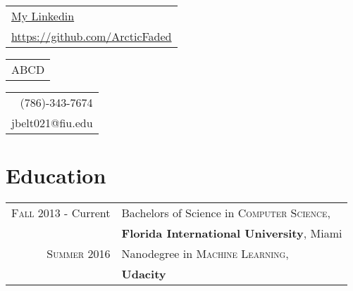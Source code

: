 \documentclass[a4paper,10pt]{article}
\begin{document}

\pagestyle{empty} %


\sffamily%
{\small\begin{tabular}[c]{l}
  \href{https://www.linkedin.com/in/jonathanbeltranus}{My Linkedin}\\
  \href{https://github.com/ArcticFaded}{https://github.com/ArcticFaded}
\end{tabular}}\hfill%
{\Large\bfseries\begin{tabular}[c]{c}
  ABCD
\end{tabular}}\hfill%
{\small\begin{tabular}[c]{r}
  (786)-343-7674 \\
  jbelt021@fiu.edu
\end{tabular}}%

\bigskip



\section{Education}
\begin{tabular}{rl}	

\textsc{Fall} 2013 - Current& Bachelors of Science in \textsc{Computer Science},\\& \textbf{Florida International University}, Miami\\

\textsc{Summer} 2016& Nanodegree in \textsc{Machine Learning},\\& \textbf{Udacity}\\


\end{tabular}
\end{document}
